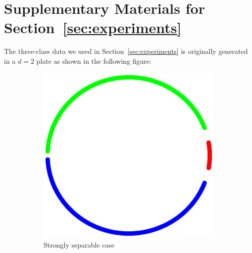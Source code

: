 \section{Supplementary Materials for Section~\ref{sec:experiments}}
\label{sec:supp-to-experiment}
The three-class data we used in Section~\ref{sec:experiments} is originally generated in a $d=2$ plate as shown in the following figure: 
\begin{figure}[h]
    \centering
    \begin{subfigure}[b]{0.23\textwidth}  
        \captionsetup{justification=centering}
        \begin{center}
        \hspace*{-0.3cm} \includegraphics[width=1.15\textwidth, trim={0, 0cm, 0, 0}, clip]{figures/strong_points}
        \caption{Strongly separable case}
        \label{fig:strong-points}
        \end{center}
    \end{subfigure}
    \hfill
    \begin{subfigure}[b]{0.23\textwidth} 
        \captionsetup{justification=centering}
        \centering

\end{subfigure}
\end{figure}
